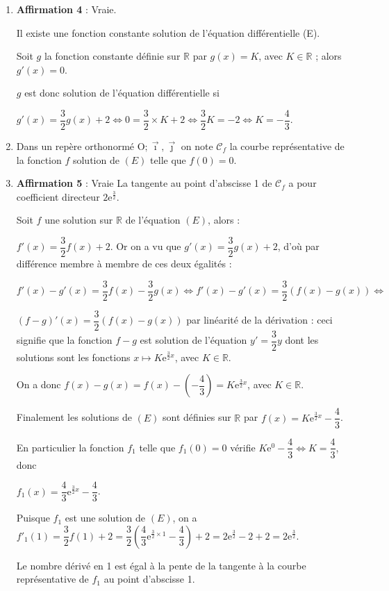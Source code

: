 \documentclass[10pt]{article}
\providecommand{\R}{\mathbb{R}}
\providecommand{\e}{{\mathrm{e}}}
\providecommand{\Oij}{\(\mathrm{O};\vec{\imath},\vec{\jmath}\)}
\begin{document}
\begin{enumerate}
\item \textbf{Affirmation 4} : Vraie.  

Il existe une fonction constante solution de l'équation différentielle (E).

Soit $g$ la fonction constante définie sur $\R$ par $g(x) = K$, avec $K \in \R$ ; alors $g'(x) = 0$.

$g$ est donc solution de l'équation différentielle si 

$g'(x) = \dfrac32g(x) + 2 \iff 0 = \dfrac32 \times K + 2 \iff \dfrac32K = - 2 \iff K= - \dfrac43$.
\item Dans un repère orthonormé \Oij{} on note $\mathcal{C}_f$ la courbe représentative de la fonction $f$ solution de $(E)$ telle  que $f(0) = 0$.

\item \textbf{Affirmation 5} : Vraie  La tangente au point d'abscisse 1 de $\mathcal{C}_f$ a pour coefficient directeur $2 \e^{\frac32}$.

Soit $f$ une  solution sur $\R$ de l'équation $(E)$, alors :

$f'(x) = \dfrac32 f(x) + 2$. Or on a vu que $g'(x) =\dfrac32 g(x) + 2$, d'où par différence membre à membre de ces deux égalités :

$f'(x) - g'(x) = \dfrac32 f(x) - \dfrac32 g(x) \iff f'(x) - g'(x) = \dfrac32 (f(x) - g(x)) \iff $

$(f - g)'(x) = \dfrac32 (f(x) - g(x))$ par linéarité de la dérivation : ceci signifie que la fonction $f - g$ est solution de l'équation $y' = \dfrac32y$ dont les solutions sont les fonctions $x \longmapsto K\e^{\frac32 x}$, avec $ K \in \R$.

On a donc $f(x) - g(x) = f(x ) - \left(- \dfrac43\right) = K\e^{\frac32 x}$, avec $ K \in \R$.

Finalement les solutions de $(E)$ sont définies sur $\R$ par $f(x) = K\e^{\frac32 x} - \dfrac43$.

En particulier la fonction $f_1$ telle que $f_1(0) = 0$ vérifie $K\e^{0} - \dfrac43 \iff K = \dfrac43$, donc 

$f_1(x) = \dfrac43\e^{\frac32 x} - \dfrac43$.

Puisque $f_1$ est une solution de $(E)$, on a $f'_1(1) = \dfrac32f(1) + 2 = \dfrac32\left(\dfrac43\e^{\frac32\times 1} - \dfrac43\right) + 2 = 2\e^{\frac32} - 2 + 2 = 2\e^{\frac32}$. 

Le nombre dérivé en 1 est égal à la pente de la tangente à la courbe représentative de $f_1$ au point d'abscisse 1.
\end{enumerate}

\bigskip
\end{document}
